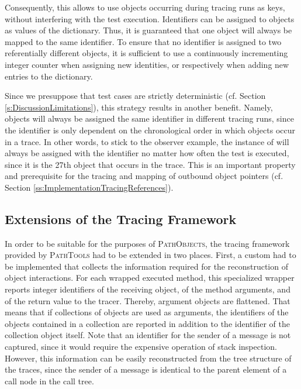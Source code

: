 Consequently, this allows to use objects occurring during tracing runs as keys, without interfering with the test execution.
Identifiers can be assigned to objects as values of the dictionary.
Thus, it is guaranteed that one object will always be mapped to the same identifier.
To ensure that no identifier is assigned to two referentially different objects, it is sufficient to use a continuously incrementing integer counter when assigning new identities, or respectively when adding new entries to the dictionary.

Since we presuppose that test cases are strictly deterministic (cf. Section \ref{s:DiscussionLimitations}), this strategy results in another benefit.
Namely, objects will always be assigned the same identifier in different tracing runs, since the identifier is only dependent on the chronological order in which objects occur in a trace.
In other words, to stick to the observer example, the instance of  will always be assigned with the identifier  no matter how often the test is executed, since it is the 27th object that occurs in the trace.
This is an important property and prerequisite for the tracing and mapping of outbound object pointers (cf. Section \ref{ss:ImplementationTracingReferences}).

\subsection{Extensions of the Tracing Framework}
\label{ss:ImplementationTracing}
In order to be suitable for the purposes of \textsc{PathObjects}, the tracing framework provided by \textsc{PathTools} had to be extended in two places.
First, a custom  had to be implemented that collects the information required for the reconstruction of object interactions.
For each wrapped executed method, this specialized wrapper reports integer identifiers of the receiving object, of the method arguments, and of the return value to the tracer.
Thereby, argument objects are flattened.
That means that if collections of objects are used as arguments, the identifiers of the objects contained in a collection are reported in addition to the identifier of the collection object itself.
Note that an identifier for the sender of a message is not captured, since it would require the expensive operation of stack inspection.
However, this information can be easily reconstructed from the tree structure of the traces, since the sender of a message is identical to the parent element of a call node in the call tree.

